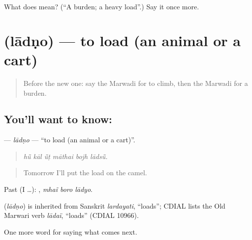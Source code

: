 \begin{tcolorbox}[breakable,colback=teal!4,colframe=teal!35!black,title={Before you move on}]
What does  mean? (\textquotedblleft{}A burden; a heavy load\textquotedblright{}.) Say it once more.
\end{tcolorbox}
\section[\texorpdfstring{\mw{लादणो} (lādṇo)}{लादणो (lādṇo)}]{ (lādṇo) — to load (an animal or a cart)}

\label{lesson:MW-C217-ladno}



\begin{quote}
Before the new one: say the Marwadi for to climb, then the Marwadi for a burden.
\end{quote}

\subsection*{You'll want to know: }
\textbf{} — \emph{lādṇo} — \textquotedblleft{}to load (an animal or a cart)\textquotedblright{}.

\begin{quote}
     
\end{quote}

\begin{quote}
\emph{hū̃ kāl ū̃ṭ māthai bojh lādsū̃.}
\end{quote}

\begin{quote}
Tomorrow I'll put the load on the camel.
\end{quote}

Past (I …):   , \emph{mhaĩ boro lādyo}.

\begin{cousinweb}
\textbf{} (\emph{lādṇo}) is inherited from Sanskrit \emph{lardayati}, \textquotedblleft{}loads\textquotedblright{}; CDIAL lists the Old Marwari verb \emph{lādaï}, \textquotedblleft{}loads\textquotedblright{} (CDIAL 10966).
\end{cousinweb}

\begin{grammarlens}[title={What you've built}]
One more word for saying what comes next.
\end{grammarlens}

